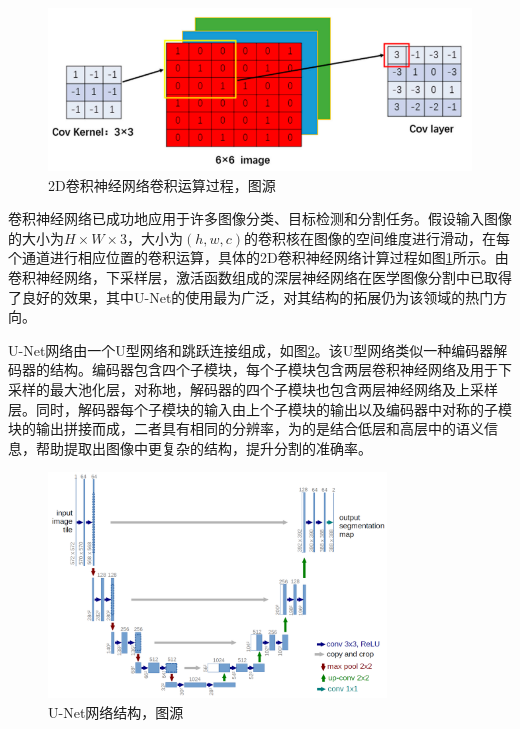 \begin{figure}
    \centering
    \includegraphics[width=\textwidth]{image/chap01/cnn.png}
    \caption{2D卷积神经网络卷积运算过程，图源\cite{liu2021review}}
    \label{fig:cnn}
\end{figure}
卷积神经网络已成功地应用于许多图像分类、目标检测和分割任务。假设输入图像的大小为$H\times W\times 3$，大小为$(h, w, c)$的卷积核在图像的空间维度进行滑动，在每个通道进行相应位置的卷积运算，具体的2D卷积神经网络计算过程如图\ref{fig:cnn}所示。由卷积神经网络，下采样层，激活函数组成的深层神经网络在医学图像分割中已取得了良好的效果\cite{chen2014semantic,ronneberger2015u,badrinarayanan2017segnet}，其中U-Net\cite{ronneberger2015u}的使用最为广泛，对其结构的拓展仍为该领域的热门方向。

U-Net网络由一个U型网络和跳跃连接组成，如图\ref{fig:unet}。该U型网络类似一种编码器解码器的结构。编码器包含四个子模块，每个子模块包含两层卷积神经网络及用于下采样的最大池化层，对称地，解码器的四个子模块也包含两层神经网络及上采样层。同时，解码器每个子模块的输入由上个子模块的输出以及编码器中对称的子模块的输出拼接而成，二者具有相同的分辨率，为的是结合低层和高层中的语义信息，帮助提取出图像中更复杂的结构，提升分割的准确率。
\begin{figure}
    \centering
    \includegraphics[width=0.8\textwidth]{image/chap01/u-net-architecture.png}
    \caption{U-Net网络结构，图源\cite{ronneberger2015u}}
    \label{fig:unet}
\end{figure}

